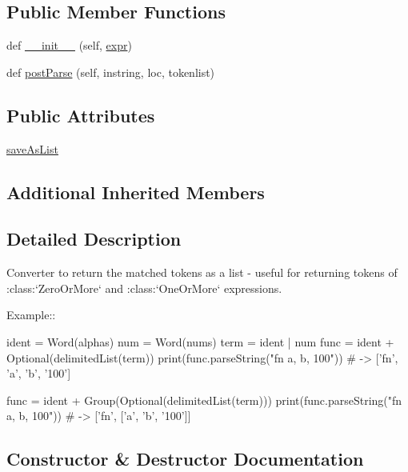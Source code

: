 \subsection*{Public Member Functions}
\begin{DoxyCompactItemize}
\item 
def \hyperlink{classpyparsing_1_1Group_a59fb596076856b39fbc6b3d5aeff66da}{\+\_\+\+\_\+init\+\_\+\+\_\+} (self, \hyperlink{classpyparsing_1_1ParseElementEnhance_a0139048279aeac38804a10d131d3c340}{expr})
\item 
def \hyperlink{classpyparsing_1_1Group_a0a74b09c6c2426a654b02ea94a39069e}{post\+Parse} (self, instring, loc, tokenlist)
\end{DoxyCompactItemize}
\subsection*{Public Attributes}
\begin{DoxyCompactItemize}
\item 
\hyperlink{classpyparsing_1_1Group_a6da052a9b51fd54a0a43f215418a1f30}{save\+As\+List}
\end{DoxyCompactItemize}
\subsection*{Additional Inherited Members}


\subsection{Detailed Description}
\begin{DoxyVerb}Converter to return the matched tokens as a list - useful for
returning tokens of :class:`ZeroOrMore` and :class:`OneOrMore` expressions.

Example::

    ident = Word(alphas)
    num = Word(nums)
    term = ident | num
    func = ident + Optional(delimitedList(term))
    print(func.parseString("fn a, b, 100"))  # -> ['fn', 'a', 'b', '100']

    func = ident + Group(Optional(delimitedList(term)))
    print(func.parseString("fn a, b, 100"))  # -> ['fn', ['a', 'b', '100']]
\end{DoxyVerb}
 

\subsection{Constructor \& Destructor Documentation}
\mbox{\label{classpyparsing_1_1Group_a59fb596076856b39fbc6b3d5aeff66da}} 
